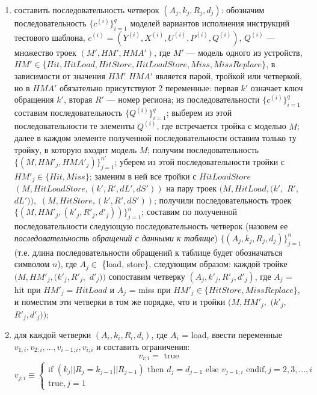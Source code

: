 \begin{enumerate}
  \item составить последовательность четверок $(A_j, k_j, R_j, d_j)$: обозначим  последовательность $\{c^{(i)}\}_{i=1}^q$ моделей вариантов исполнения инструкций тестового шаблона, $c^{(i)} = (Y^{(i)}, X^{(i)}, U^{(i)}, P^{(i)}, Q^{(i)})$, $Q^{(i)}$ --- множество троек $(M', HM', HMA')$, где $M'$ --- модель одного из устройств, $HM' \in \{Hit, HitLoad, HitStore, HitLoadStore, Miss, MissReplace\}$, в зависимости от значения $HM'$ $HMA'$ является парой, тройкой или четверкой, но в $HMA'$ обязательно присутствуют 2 переменные: первая $k'$ означает ключ обращения $k'$, вторая $R'$ --- номер региона; из последовательности $\{c^{(i)}\}_{i=1}^q$ составим последовательность $\{Q^{(i)}\}_{i=1}^q$; выберем из этой последовательности те элементы $Q^{(i)}$, где встречается тройка с моделью $M$; далее в каждом элементе полученной последовательности оставим только ту тройку, в которую входит модель $M$; получим последовательность $\{(M, HM'_j, HMA'_j)\}_{j=1}^{n'}$; уберем из этой последовательности тройки с $HM'_j \in \{Hit, Miss\}$; заменим в ней все тройки с $HitLoadStore$ $(M, HitLoadStore, (k', R', dL', dS'))$ на пару троек $(M, HitLoad, (k',$ $R',$ $dL')),$ $(M, HitStore, (k', R', dS'))$; получили последовательность троек\\ $\{(M, HM'_j, (k'_j, R'_j, d'_j))\}_{j=1}^n$; составим по полученной последовательности следующую последовательность четверок (назовем ее \emph{последовательность обращений с данными к таблице}) $\{(A_j, k_j, R_j, d_j)\}_{j=1}^n$ (т.е. длина последовательности обращений к таблице будет обозначаться символом $n$), где $A_j \in$ \{load, store\}, следующим образом: каждой тройке $(M, HM'_j, (k'_j, R'_j,$ $d'_j))$ сопоставим четверку $(A_j, k'_j, R'_j, d'_j)$, где $A_j$ = hit при $HM'_j = HitLoad$ и $A_j$ = miss при $HM'_j \in \{HitStore, MissReplace\}$, и поместим эти четверки в том же порядке, что и тройки $(M, HM'_j,$ $(k'_j,$ $R'_j, d'_j))$;
  \item для каждой четверки $(A_i, k_i, R_i, d_i)$, где $A_i$ = load, ввести переменные $v_{1;i}, v_{2;i}, ..., v_{i-1;i}, v_{i;i}$ и составить ограничения:
$$v_{i;i} = \mbox{~true}$$
$$v_{j;i} \equiv \begin{cases} \mbox{if~} (k_j||R_j = k_{j-1}||R_{j-1}) \mbox{~then~} d_j = d_{j-1} \mbox{~else~} v_{j-1;i} \mbox{~endif}, j{=}2,3,...,i\\
\mbox{true}, j{=}1\end{cases}$$
\end{enumerate}


